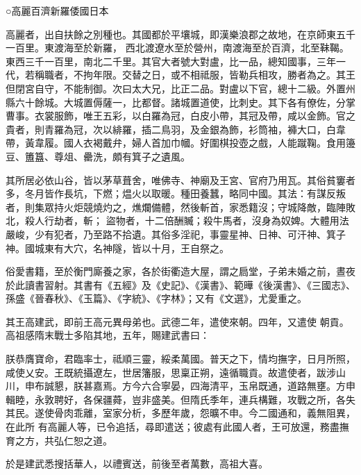 
\begin{pinyinscope}

 ○高麗百濟新羅倭國日本



 高麗者，出自扶餘之別種也。其國都於平壤城，即漢樂浪郡之故地，在京師東五千一百里。東渡海至於新羅，
 西北渡遼水至於營州，南渡海至於百濟，北至靺鞨。東西三千一百里，南北二千里。其官大者號大對盧，比一品，總知國事，三年一代，若稱職者，不拘年限。交替之日，或不相祗服，皆勒兵相攻，勝者為之。其王但閉宮自守，不能制御。次曰太大兄，比正二品。對盧以下官，總十二級。外置州縣六十餘城。大城置傉薩一，比都督。諸城置道使，比刺史。其下各有僚佐，分掌曹事。衣裳服飾，唯王五彩，以白羅為冠，白皮小帶，其冠及帶，咸以金飾。官之
 貴者，則青羅為冠，次以緋羅，插二鳥羽，及金銀為飾，衫筒袖，褲大口，白韋帶，黃韋履。國人衣褐戴弁，婦人首加巾幗。好圍棋投壺之戲，人能蹴鞠。食用籩豆、簠簋、尊俎、罍洗，頗有箕子之遺風。



 其所居必依山谷，皆以茅草葺舍，唯佛寺、神廟及王宮、官府乃用瓦。其俗貧窶者多，冬月皆作長坑，下燃；煴火以取暖。種田養蠶，略同中國。其法：有謀反叛者，則集眾持火炬競燒灼之，燋爛備體，然後斬首，家悉籍沒；守城降敵，臨陣敗北，殺人行劫者，斬；
 盜物者，十二倍酬贓；殺牛馬者，沒身為奴婢。大體用法嚴峻，少有犯者，乃至路不拾遺。其俗多淫祀，事靈星神、日神、可汗神、箕子神。國城東有大穴，名神隧，皆以十月，王自祭之。



 俗愛書籍，至於衡門廝養之家，各於街衢造大屋，謂之扃堂，子弟未婚之前，晝夜於此讀書習射。其書有《五經》及《史記》、《漢書》、範曄《後漢書》、《三國志》、孫盛《晉春秋》、《玉篇》、《字統》、《字林》；又有《文選》，尤愛重之。



 其王高建武，即前王高元異母弟也。武德二年，遣使來朝。四年，又遣使
 朝貢。高祖感隋末戰士多陷其地，五年，賜建武書曰：



 朕恭膺寶命，君臨率士，祗順三靈，綏柔萬國。普天之下，情均撫字，日月所照，咸使乂安。王既統攝遼左，世居籓服，思稟正朔，遠循職貢。故遣使者，跋涉山川，申布誠懇，朕甚嘉焉。方今六合寧晏，四海清平，玉帛既通，道路無壅。方申輯睦，永敦聘好，各保疆蕣，豈非盛美。但隋氏季年，連兵構難，攻戰之所，各失其民。遂使骨肉乖離，室家分析，多歷年歲，怨曠不申。今二國通和，義無阻異，在此所
 有高麗人等，已令追括，尋即遣送；彼處有此國人者，王可放還，務盡撫育之方，共弘仁恕之道。



 於是建武悉搜括華人，以禮賓送，前後至者萬數，高祖大喜。




\end{pinyinscope}
